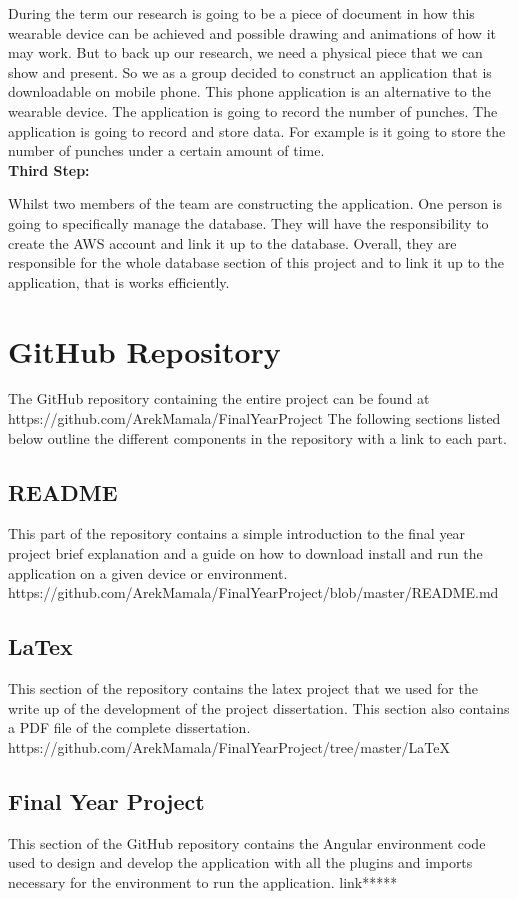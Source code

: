 \documentclass[a4paper,12pt,twoside]{report}
\begin{document}
During the term our research is going to be a piece of document in how this wearable device can be achieved and possible drawing and animations of how it may work. But to back up our research, we need a physical piece that we can show and present. So we as a group decided to construct an application that is downloadable on mobile phone. This phone application is an alternative to the wearable device. The application is going to record the number of punches. The application is going to record and store data. For example is it going to store the number of punches under a certain amount of time.
\\
\textbf{Third Step:}

Whilst two members of the team are constructing the application. One person is going to specifically manage the database. They will have the responsibility to create the AWS account and link it up to the database. Overall, they are responsible for the whole database section of this project and to link it up to the application, that is works efficiently.

\section{GitHub Repository}
The GitHub repository containing the entire project can be found at 
https://github.com/ArekMamala/FinalYearProject
The following sections listed below outline the different components in the repository with a link to each part.
\subsection{README}
This part of the repository contains a simple introduction to the final year project brief explanation and a guide on how to download  install and run the application on a given device or environment.
https://github.com/ArekMamala/FinalYearProject/blob/master/README.md
\subsection{LaTex}
This section of the repository contains the latex project that we used for the write up of the development of the project dissertation. This section also contains a PDF file of the complete dissertation.  
https://github.com/ArekMamala/FinalYearProject/tree/master/LaTeX
\subsection{Final Year Project}
This section of the GitHub repository contains the Angular environment code used to design and develop the application with all the plugins and imports necessary for the environment to run the application. 
link*****
\end{document}
